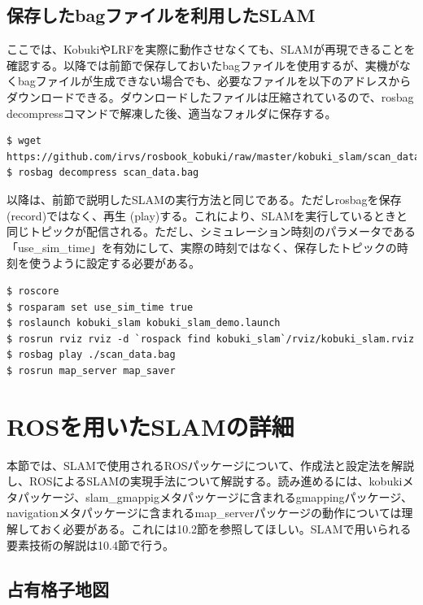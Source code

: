 \subsection{保存したbagファイルを利用したSLAM}

ここでは、KobukiやLRFを実際に動作させなくても、SLAMが再現できることを確認する。以降では前節で保存しておいたbagファイルを使用するが、実機がなくbagファイルが生成できない場合でも、必要なファイルを以下のアドレスからダウンロードできる。ダウンロードしたファイルは圧縮されているので、rosbag decompressコマンドで解凍した後、適当なフォルダに保存する。

\begin{lstlisting}[language=ROS]
$ wget https://github.com/irvs/rosbook_kobuki/raw/master/kobuki_slam/scan_data.bag
$ rosbag decompress scan_data.bag
\end{lstlisting}

以降は、前節で説明したSLAMの実行方法と同じである。ただしrosbagを保存 (record)ではなく、再生 (play)する。これにより、SLAMを実行しているときと同じトピックが配信される。ただし、シミュレーション時刻のパラメータである「use\_sim\_time」を有効にして、実際の時刻ではなく、保存したトピックの時刻を使うように設定する必要がある。

\begin{lstlisting}[language=ROS]
$ roscore
$ rosparam set use_sim_time true
$ roslaunch kobuki_slam kobuki_slam_demo.launch
$ rosrun rviz rviz -d `rospack find kobuki_slam`/rviz/kobuki_slam.rviz
$ rosbag play ./scan_data.bag
$ rosrun map_server map_saver
\end{lstlisting}

\section{ROSを用いたSLAMの詳細}

本節では、SLAMで使用されるROSパッケージについて、作成法と設定法を解説し、ROSによるSLAMの実現手法について解説する。読み進めるには、kobukiメタパッケージ、slam\_gmappigメタパッケージに含まれるgmappingパッケージ、navigationメタパッケージに含まれるmap\_serverパッケージの動作については理解しておく必要がある。これには10.2節を参照してほしい。SLAMで用いられる要素技術の解説は10.4節で行う。

\subsection{占有格子地図}

